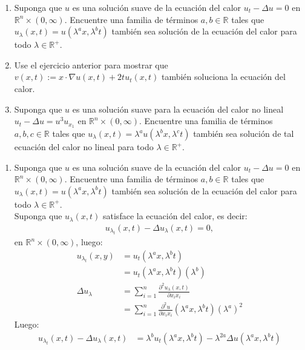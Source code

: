 \begin{homeworkProblem}
  \begin{enumerate}
    \item Suponga que $u$ es una solución suave de la ecuación del calor $u_t-\Delta u=0$ en $\mathbb{R}^{n}\times (0,\infty)$. Encuentre una familia de términos $a,b\in\mathbb{R}$ tales que $u_\lambda(x,t)=u(\lambda^ax,\lambda^bt)$ también sea solución de la ecuación del calor para todo $\lambda\in\mathbb{R}^{+}$.
    \item Use el ejercicio anterior para mostrar que $v(x,t):=x\cdot \nabla u(x,t)+2tu_t(x,t)$ también soluciona la ecuación del calor.
    \item Suponga que $u$ es una solución suave para la ecuación del calor no lineal $u_t-\Delta u=u^3u_{x_1}$ en $\mathbb{R}^{n}\times (0,\infty)$. Encuentre una familia de términos $a,b,c\in\mathbb{R}$ tales que $u_\lambda(x,t)=\lambda^au(\lambda^bx,\lambda^ct)$ también sea solución de tal ecuación del calor no lineal para todo $\lambda\in\mathbb{R}^{+}$. 
  \end{enumerate}
  \begin{solucion}
    \begin{enumerate}
      \item Suponga que $u$ es una solución suave de la ecuación del calor $u_t-\Delta u=0$ en $\mathbb{R}^{n}\times (0,\infty)$. Encuentre una familia de términos $a,b\in\mathbb{R}$ tales que $u_\lambda(x,t)=u(\lambda^ax,\lambda^bt)$ también sea solución de la ecuación del calor para todo $\lambda\in\mathbb{R}^{+}$.\\
        Suponga que $u_\lambda(x,t)$ satisface la ecuación del calor, es decir:
        \begin{align*}
          u_{\lambda_{t}}(x,t)-\Delta u_{\lambda}(x,t)=0,
        \end{align*}
        en $\mathbb{R}^{n} \times (0,\infty)$, luego:
        \begin{align*}
          u_{\lambda_{t}}(x,y)&=u_t(\lambda^ax,\lambda^bt)\\
          &=u_t(\lambda^ax,\lambda^bt)(\lambda^b)\\
          \Delta u_\lambda&=\sum_{i=1}^{n}\frac{\partial^2 u_\lambda(x,t)}{\partial x_ix_i}\\
          &=\sum_{i=1}^n\frac{\partial^2 u}{\partial x_ix_i}(\lambda^ax,\lambda^bt)(\lambda^a)^2
        \end{align*}
        Luego:
        \begin{align*}
          u_{\lambda_t}(x,t)-\Delta u_\lambda(x,t)&=\lambda^b u_t(\lambda^ax,\lambda^{b}t)-\lambda^{2a}\Delta u (\lambda^ax,\lambda^bt)\\

\end{align*}
\end{enumerate}
\end{solucion}
\end{homeworkProblem}
